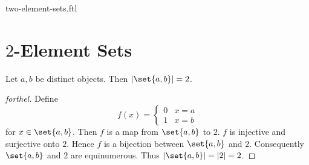\documentclass{naproche-library}
\begin{document}
\begin{smodule}{two-element-sets.ftl}

  \section*{$2$-Element Sets}

  \begin{proposition}[forthel,id=SET_THEORY_07_5465279026954240,printid]
    Let $a, b$ be distinct objects.
    Then $|\set{a,b}| = 2$.
  \end{proposition}
  \begin{proof}[forthel]
    Define \[ f(x) =
      \begin{cases}
        0 & x = a
        \\
        1 & x = b
      \end{cases} \]
    for $x \in \set{a,b}$.
    Then $f$ is a map from $\set{a,b}$ to $2$.
    $f$ is injective and surjective onto $2$.
    Hence $f$ is a bijection between $\set{a,b}$ and $2$.
    Consequently $\set{a,b}$ and $2$ are equinumerous.
    Thus $|\set{a,b}| = |2| = 2$.
  \end{proof}
\end{smodule}
\end{document}
